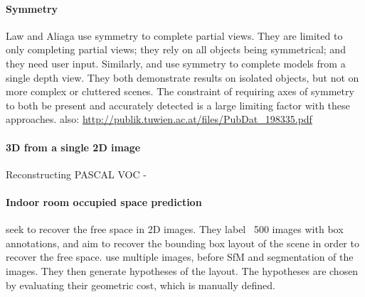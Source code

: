 \documentclass[10pt,twocolumn,letterpaper]{article}
\begin{document}


\paragraph{Symmetry}
Law and Aliaga \cite{law-cviu-2010} use symmetry to complete partial views. 
They are limited to only completing partial views; they rely on all objects being symmetrical; and they need user input.
Similarly, \cite{thrun-iccv-2005} and \cite{kroemer-humanoids-2012} use symmetry to complete models from a single depth view. 
They both demonstrate results on isolated objects, but not on more complex or cluttered scenes. 
The constraint of requiring axes of symmetry to both be present and accurately detected is a large limiting factor with these approaches.
also: \url{http://publik.tuwien.ac.at/files/PubDat_198335.pdf}

\paragraph{3D from a single 2D image}
Reconstructing PASCAL VOC - \cite{vicente-cvpr-2014}

\paragraph{Indoor room occupied space prediction}
\cite{hedau-cvpr-2012} seek to recover the free space in 2D images. They label ~500 images with box annotations, and aim to recover the bounding box layout of the scene in order to recover the free space.
\cite{bao-wacv-2014} use multiple images, before SfM and segmentation of the images. 
They then generate hypotheses of the layout. 
The hypotheses are chosen by evaluating their geometric cost, which is manually defined. 
\end{document}
